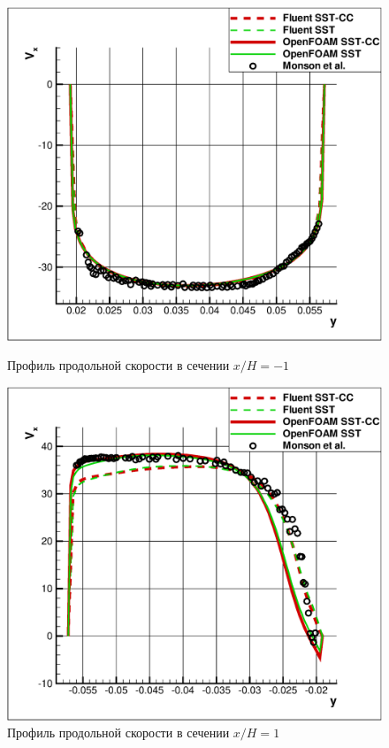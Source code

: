 \begin{figure}[ht]
	\vspace{-1em}
	\begin{minipage}{0.475\linewidth}
		\includegraphics[scale=0.33]{xh1up}
		\caption{Профиль продольной скорости в сечении $x/H=-1$}
		\label{fig:x1up}
	\end{minipage}
	\hspace{0.5em}
	\begin{minipage}{0.475\linewidth}
		\includegraphics[scale=0.33]{xh1down}
		\caption{Профиль продольной скорости в сечении $x/H=1$}
		\label{fig:x1down}
	\end{minipage}
\end{figure}
\clearpage

